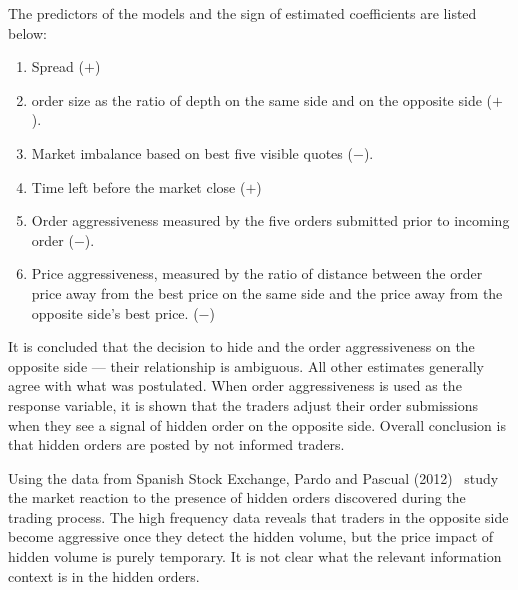 The predictors of the models and the sign of estimated coefficients are listed below:
        \begin{enumerate}[--]
        \item Spread ($+$)
        \item order size as the ratio of depth on the same side and on the opposite side ($+$).
        \item Market imbalance based on best five visible quotes ($-$).
        \item Time left before the market close ($+$)
        \item Order aggressiveness measured by the five orders submitted prior to incoming order ($-$).
        \item Price aggressiveness, measured by the ratio of distance between the order price away from the best price on the same side and the price away from the opposite side's best price. ($-$)
        \end{enumerate}

It is concluded that the decision to hide and the order aggressiveness on the opposite side --- their relationship is ambiguous. All other estimates generally agree with what was postulated. When order aggressiveness is used as the response variable, it is shown that the traders adjust their order submissions when they see a signal of hidden order on the opposite side. Overall conclusion is that hidden orders are posted by not informed traders. 


Using the data from Spanish Stock Exchange, Pardo and Pascual (2012)~\cite{pardopas} study the market reaction to the presence of hidden orders discovered during the trading process. The high frequency data reveals that traders in the opposite side become aggressive once they detect the hidden volume, but the price impact of hidden volume is purely temporary. It is not clear what the relevant information context is in the hidden orders.


